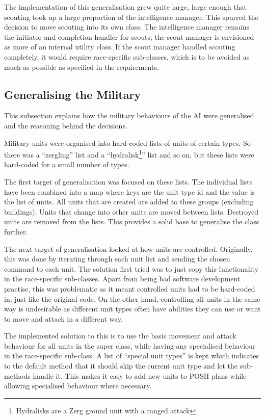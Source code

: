 \documentclass[11pt,openright,a4paper]{report}
\begin{document}
The implementation of this generalisation grew quite large, large enough that scouting took up a large proportion of the intelligence manager. This spurred the decision to move scouting into its own class. The intelligence manager remains the initiator and completion handler for scouts; the scout manager is envisioned as more of an internal utility class. If the scout manager handled scouting completely, it would require race-specific sub-classes, which is to be avoided as much as possible as specified in the requirements.

\subsection{Generalising the Military}
This subsection explains how the military behaviours of the AI were generalised and the reasoning behind the decisions.

Military units were organised into hard-coded lists of units of certain types. So there was a ``zergling'' list and a ``hydralisk\footnote{Hydralisks are a Zerg ground unit with a ranged attack}'' list and so on, but these lists were hard-coded for a small number of types.

The first target of generalisation was focused on these lists. The individual lists have been combined into a map where keys are the unit type id and the value is the list of units. All units that are created are added to these groups (excluding buildings). Units that change into other units are moved between lists. Destroyed units are removed from the lists. This provides a solid base to generalise the class further.

The next target of generalisation looked at how units are controlled. Originally, this was done by iterating through each unit list and sending the chosen command to each unit. The solution first tried was to just copy this functionality in the race-specific sub-classes. Apart from being bad software development practise, this was problematic as it meant controlled units had to be hard-coded in, just like the original code. On the other hand, controlling all units in the same way is undesirable as different unit types often have abilities they can use or want to move and attack in a different way.

The implemented solution to this is to use the basic movement and attack behaviour for all units in the super class, while having any specialised behaviour in the race-specific sub-class. A list of ``special unit types'' is kept which indicates to the default method that it should skip the current unit type and let the sub-methods handle it. This makes it easy to add new units to POSH plans while allowing specialised behaviour where necessary.
\end{document}
